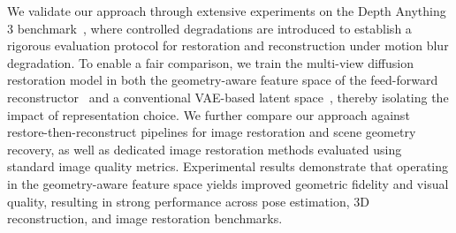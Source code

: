 We validate our approach through extensive experiments on the Depth Anything 3 benchmark~\cite{depthanything3}, where controlled degradations are introduced to establish a rigorous evaluation protocol for restoration and reconstruction under motion blur degradation. To enable a fair comparison, we train the multi-view diffusion restoration model in both the geometry-aware feature space of the feed-forward reconstructor~\cite{depthanything3} and a conventional VAE-based latent space~\cite{kingma2013auto}, thereby isolating the impact of representation choice. We further compare our approach against restore-then-reconstruct pipelines for image restoration and scene geometry recovery, as well as dedicated image restoration methods evaluated using standard image quality metrics. Experimental results demonstrate that operating in the geometry-aware feature space yields improved geometric fidelity and visual quality, resulting in strong performance across pose estimation, 3D reconstruction, and image restoration benchmarks.







